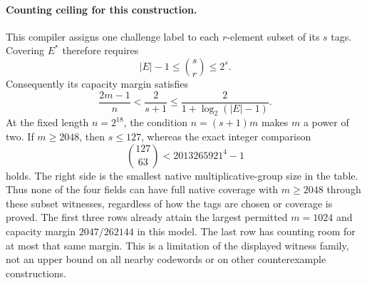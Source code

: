 \paragraph{Counting ceiling for this construction.}
This compiler assigns one challenge label to each $r$-element subset
of its $s$ tags.  Covering $E^*$ therefore requires
\[
 |E|-1\le\binom{s}{r}\le2^s.
\]
Consequently its capacity margin satisfies
\[
 \frac{2m-1}{n}<\frac{2}{s+1}
 \le\frac{2}{1+\log_2(|E|-1)}.
\]
At the fixed length $n=2^{18}$, the condition $n=(s+1)m$ makes $m$
a power of two.  If $m\ge2048$, then $s\le127$, whereas the exact
integer comparison
\[
 \binom{127}{63}<2013265921^4-1
\]
holds.  The right side is the smallest native multiplicative-group
size in the table.  Thus none of the four fields can have full native
coverage with $m\ge2048$ through these subset witnesses, regardless
of how the tags are chosen or coverage is proved.  The first three
rows already attain the largest permitted $m=1024$ and capacity
margin $2047/262144$ in this model.  The last row has counting room
for at most that same margin.  This is a limitation of the displayed
witness family, not an upper bound on all nearby codewords or on
other counterexample constructions.

